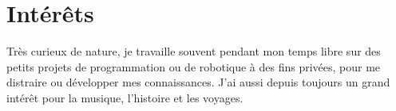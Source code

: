 \documentclass[letterpaper]{twentysecondcv} %
\begin{document}

\section{Intérêts}
Très curieux de nature, je travaille souvent pendant mon temps libre sur des petits projets de programmation ou de robotique à des fins privées, pour me distraire ou développer mes connaissances. J’ai aussi depuis toujours un grand intérêt pour la musique, l’histoire et les voyages.
\end{document}
